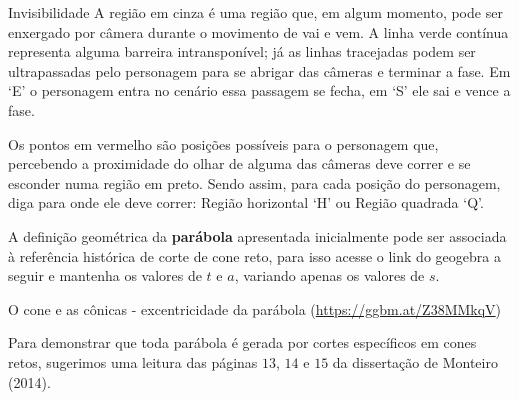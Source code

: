 \begin{task}{Invisibilidade}
A região em cinza é uma região que, em algum momento, pode ser enxergado por câmera durante o movimento de vai e vem. A linha verde contínua representa alguma barreira intransponível; já as linhas tracejadas podem ser ultrapassadas pelo personagem para se abrigar das câmeras e terminar a fase. Em ‘E’ o personagem entra no cenário essa passagem se fecha, em ‘S’ ele sai e vence a fase.

Os pontos em vermelho são posições possíveis para o personagem que, percebendo a proximidade do olhar de alguma das câmeras deve correr e se esconder numa região em preto. Sendo assim, para cada posição do personagem, diga para onde ele deve correr: Região horizontal ‘H’ ou Região quadrada ‘Q’.
\end{task}

\begin{research}{}

A definição geométrica da \textbf{parábola} apresentada inicialmente pode ser associada à referência histórica de corte de cone reto, para isso acesse o link do geogebra a seguir e mantenha os valores de \(t\) e \(a\), variando apenas os valores de \(s\).

O cone e as cônicas - excentricidade da parábola (\url{https://ggbm.at/Z38MMkqV})

Para demonstrar que toda parábola é gerada por cortes específicos em cones retos, sugerimos uma leitura das páginas \(13\), \(14\) e \(15\) da dissertação de Monteiro (2014).
\end{research}

